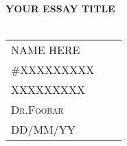 \documentclass[12pt]{article} %
\begin{document}
\begin{titlepage}


\center %
 




\vspace*{5cm}
{ \huge \bfseries \textsc{YOUR ESSAY TITLE}}\\[0.4cm] %
 

~




\vfill

\begin{flushright}
  \begin{tabular}{ l  c  r }
  \textsc{NAME HERE}\\ %
\textsc{\#XXXXXXXXX}\\ %
\textsc{XXXXXXXXX}\\ %
\textsc{Dr.Foobar}\\ %
DD/MM/YY
  \end{tabular}
\end{flushright}



\end{titlepage}
\end{document}
